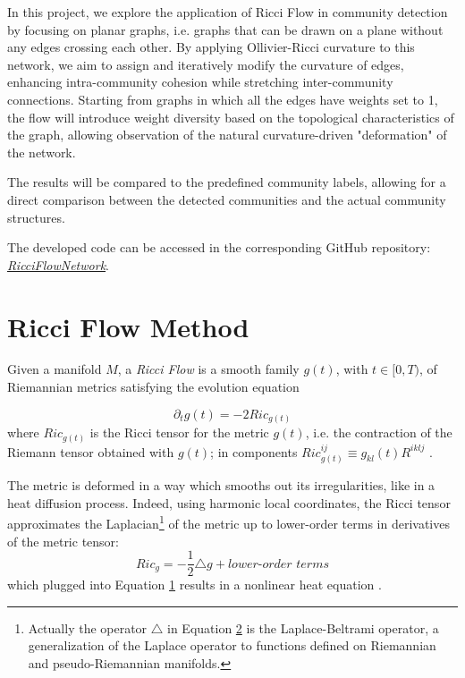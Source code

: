 \documentclass[12pt,a4paper]{article}
\begin{document}
In this project, we explore the application of Ricci Flow in community detection by focusing on planar graphs, i.e. graphs that can be drawn on a plane without any edges crossing each other. By applying Ollivier-Ricci curvature to this network, we aim to assign and iteratively modify the curvature of edges, enhancing intra-community cohesion while stretching inter-community connections. Starting from graphs in which all the edges have weights set to 1, the flow will introduce weight diversity based on the topological characteristics of the graph, allowing observation of the natural curvature-driven "deformation" of the network.

The results will be compared to the predefined community labels, allowing for a direct comparison between the detected communities and the actual community structures. 

The developed code can be accessed in the corresponding GitHub repository: \textit{\href{https://github.com/fabbri-lorenzo/RicciFlowNetwork}{RicciFlowNetwork}}.
\newpage

\section{Ricci Flow Method}
Given a manifold $M$, a \textit{Ricci Flow} is a smooth family $g(t)$, with $ t \in [0,T)$, of Riemannian metrics satisfying the evolution equation

\begin{equation}\label{eq1}
    \partial_t g(t) = -2 Ric_{g(t)}
\end{equation}
where $Ric_{g(t)}$ is the Ricci tensor for the metric $g(t)$, i.e. the contraction of the Riemann tensor obtained with $g(t)$; in components $Ric_{g(t)}^{ij} \equiv g_{kl}(t)R^{iklj}$ \cite{recentdevelopmentsricciflows}.

The metric is deformed in a way which smooths out its irregularities, like in a heat diffusion process. Indeed, using harmonic local coordinates, the Ricci tensor approximates the Laplacian\footnote{Actually the operator $\triangle$ in Equation \hyperref[eq2]{2} is the Laplace-Beltrami operator, a generalization of the Laplace operator to functions defined on Riemannian and pseudo-Riemannian manifolds.} of the metric up to lower-order terms in derivatives of the metric tensor:
\begin{equation}\label{eq2}
    Ric_{g} = -\frac{1}{2}\triangle g + \textit{lower-order terms}
\end{equation}
which plugged into Equation \hyperref[eq1]{1} results in a nonlinear heat equation \cite{theRicciFlowAnIntroduction}.
\end{document}
